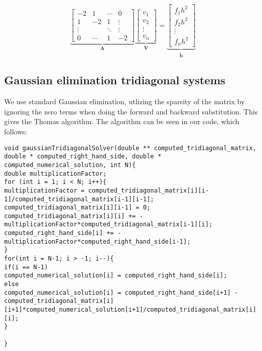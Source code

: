 \documentclass{article}
\begin{document}
\begin{equation}
\underbrace{\begin{bmatrix} -2 & 1 & \cdots & 0 \\ 1 & -2 & 1 & \vdots \\
\vdots & &  \ddots & \vdots \\ 
0 & \cdots & 1 & -2 \end{bmatrix}}_{\mathbf{A}} 
\underbrace{\begin{bmatrix} v_1\\ v_2 \\ \vdots\\ v_n \end{bmatrix}}_{\mathbf{V}} = 
\underbrace{\begin{bmatrix} f_1 h^2\\ f_2 h^2 \\ \vdots \\ f_nh^2\end{bmatrix}}_{\mathbf{\tilde{b}}}
\end{equation}


\subsection{Gaussian elimination tridiagonal systems}
We use standard Gaussian elimination, utlizing the sparsity of the matrix by ignoring the zero terms when doing the forward and backward substitution. This gives the Thomas algorithm. The algorithm can be seen in our code, which follows:

\begin{lstlisting}
void gaussianTridiagonalSolver(double ** computed_tridiagonal_matrix, double * computed_right_hand_side, double * computed_numerical_solution, int N){
double multiplicationFactor;
for (int i = 1; i < N; i++){
multiplicationFactor = computed_tridiagonal_matrix[i][i-1]/computed_tridiagonal_matrix[i-1][i-1];
computed_tridiagonal_matrix[i][i-1] = 0;
computed_tridiagonal_matrix[i][i] += - multiplicationFactor*computed_tridiagonal_matrix[i-1][i];
computed_right_hand_side[i] += - multiplicationFactor*computed_right_hand_side[i-1];
}
for(int i = N-1; i > -1; i--){
if(i == N-1)
computed_numerical_solution[i] = computed_right_hand_side[i];
else
computed_numerical_solution[i] = computed_right_hand_side[i+1] - computed_tridiagonal_matrix[i][i+1]*computed_numerical_solution[i+1]/computed_tridiagonal_matrix[i][i];
}

}
\end{lstlisting}
\end{document}
